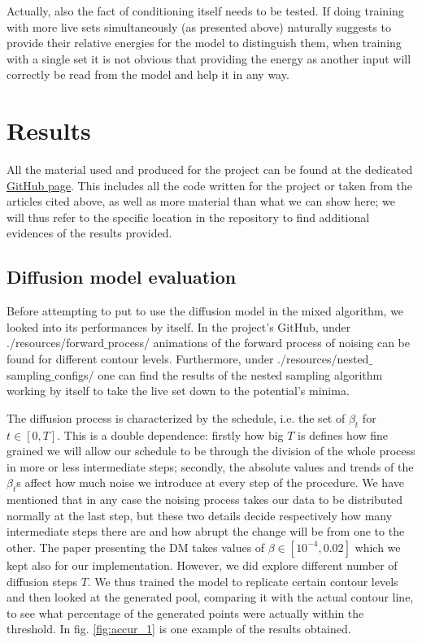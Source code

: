 \documentclass[a4paper, 12pt]{article}          %
\begin{document}
Actually, also the fact of conditioning itself needs to be tested. If doing training with more live sets simultaneously (as presented above) naturally suggests to provide their relative energies for the model to distinguish them, when training with a single set it is not obvious that providing the energy as another input will correctly be read from the model and help it in any way.



\section{Results} \label{sec:results}


All the material used and produced for the project can be found at the dedicated \href{https://github.com/tommasoperitoree/CSM_Lab}{GitHub page}. This includes all the code written for the project or taken from the articles cited above, as well as more material than what we can show here; we will thus refer to the specific location in the repository to find additional evidences of the results provided.

\subsection{Diffusion model evaluation}

Before attempting to put to use the diffusion model in the mixed algorithm, we looked into its performances by itself. In the project's GitHub, under ./resources/forward$\_$process/ animations of the forward process of noising can be found for different contour levels. Furthermore, under ./resources/nested$\_$sampling$\_$configs/ one can find the results of the nested sampling algorithm working by itself to take the live set down to the potential's minima.

The diffusion process is characterized by the schedule, i.e. the set of $\beta_t$ for $t\in[0,T]$. This is a double dependence: firstly how big $T$ is defines how fine grained we will allow our schedule to be through the division of the whole process in more or less intermediate steps; secondly, the absolute values and trends of the $\beta_t$s affect how much noise we introduce at every step of the procedure. We have mentioned that in any case the noising process takes our data to be distributed normally at the last step, but these two details decide respectively how many intermediate steps there are and how abrupt the change will be from one to the other. The paper presenting the DM \cite{Ho2020} takes values of $\beta\in[10^{-4},0.02]$ which we kept also for our implementation. However, we did explore different number of diffusion steps $T$. We thus trained the model to replicate certain contour levels and then looked at the generated pool, comparing it with the actual contour line, to see what percentage of the generated points were actually within the threshold. In fig. \ref{fig:accur_1} is one example of the results obtained. 
\end{document}
